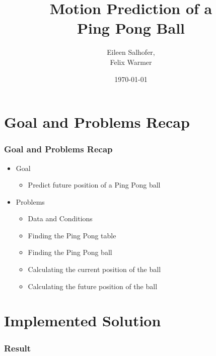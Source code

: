 \documentclass{beamer}
\title[Thema oder andere gleichbleibende Information]{ Motion Prediction of a \\Ping Pong Ball}
\author{Eileen Salhofer, \\Felix Warmer}
\date{\today}
\institute[]{}
\begin{document}
\titleframe



\section{Goal and Problems Recap}
\begin{frame}
	\frametitle{Goal and Problems Recap}
	\begin{itemize}
		\item Goal
		\begin{itemize}
			\item Predict future position of a Ping Pong ball 
		\end{itemize}
		\item Problems
		\begin{itemize}
			\item Data and Conditions
			\item Finding the Ping Pong table
			\item Finding the Ping Pong ball
			\item Calculating the current position of the ball 
			\item Calculating the future position of the ball 
		\end{itemize}
	\end{itemize}
\end{frame}


\section{Implemented Solution}
\begin{frame}
	\frametitle{Result}
	\begin{center}
	
	\end{center}
\end{frame}
\end{document}

